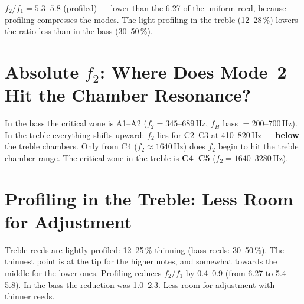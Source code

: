 \documentclass[11pt,a4paper]{article}
\begin{document}
\begin{center}
\end{center}

\begin{tcolorbox}[colframe=keygreen, colback=green!5!white]
\textbf{$f_2/f_1 = 5{.}3$--$5{.}8$} (profiled) --- lower than the 6.27
of the uniform reed, because profiling compresses the modes.
The light profiling in the treble (12--28\,\%) lowers the ratio
less than in the bass (30--50\,\%).
\end{tcolorbox}

\section{Absolute $f_2$: Where Does Mode~2 Hit the Chamber Resonance?}

In the bass the critical zone is A1--A2 ($f_2 = 345$--$689$\,Hz,
$f_H$ bass $= 200$--$700$\,Hz). In the treble everything shifts upward:
$f_2$ lies for C2--C3 at 410--820\,Hz --- \textbf{below} the treble chambers.
Only from C4 ($f_2 \approx 1640$\,Hz) does $f_2$ begin to hit the treble chamber range.
The critical zone in the treble is \textbf{C4--C5}
($f_2 = 1640$--$3280$\,Hz).

\section{Profiling in the Treble: Less Room for Adjustment}

Treble reeds are lightly profiled: 12--25\,\% thinning
(bass reeds: 30--50\,\%). The thinnest point is at the tip for the higher notes,
and somewhat towards the middle for the lower ones. Profiling reduces
$f_2/f_1$ by 0.4--0.9 (from 6.27 to 5.4--5.8). In the bass the reduction was
1.0--2.3. Less room for adjustment with thinner reeds.
\end{document}
